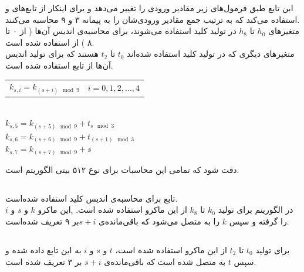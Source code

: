 این تابع طبق فرمول‌های زیر مقادیر ورودی را تغییر می‌دهد و برای اینکار از تابع‌های \hyperref[subsec:SKBI]{} و \hyperref[subsec:SKBT]{} استفاده می‌کند که به ترتیب جمع مقادیر ورودی‌شان را به پیمانه ۳ و ۹ محاسبه می‌کنند.
\\متغیرهای $ h_0 $ تا $ h_8 $ در تولید کلید استفاده می‌شوند، برای محاسبه‌ی اندیس آن‌ها ( از ۰ تا ۸ ) از  استفاده شده است.
\\
متغیر‌های دیگری که در تولید کلید استفاده شده‌اند $ t_0 $ تا $ t_2 $ هستند که برای تولید اندیس آن‌ها از تابع  استفاده شده است.\\
\begin{latin}
	\begin{center}
		\begin{tabular}{c c}
			$k_{s, i} = k_{(s+i) \mod 9} $ \hspace{15mm} & $  i = 0, 1, 2, ... , 4 $ \\
			
			
		\end{tabular}
	\\
	$k_{s, 5} = k_{(s+5) \mod 9} + t_{s \mod 3}$ \\
	$k_{s, 6} = k_{(s+6) \mod 9} + t_{(s+1) \mod 3}$ \\
	$k_{s, 7} = k_{(s+7) \mod 9} + s $\\	
	\end{center}
\end{latin}

دقت شود که تمامی این محاسبات برای نوع ۵۱۲ بیتی الگوریتم است.




\subsection{}
\label{subsec:SKBI}

تابع  برای محاسبه‌ی اندیس کلید استفاده‌ شده‌است. \\ 
در الگوریتم برای تولید $k_0 $ تا $ k_8 $ از این ماکرو استفاده شده ‌است.  ,این ماکرو $ k $ و $ s $ و $ i $ را گرفته و سپس $ k $ را به متصل می‌شود که باقی‌مانده‌ی ‌$s + i $بر ۹ تعریف شده‌است.


\subsection{}
\label{subsec:SKBT}
برای تولید $ t_0 $ تا $ t_2 $ از این ماکرو استفاده شده است، $ t $ و $ s $ و ‌$ i $ به این تابع داده شده و سپس $ t $ به  متصل شده است که باقی‌مانده‌ی $ s + i $ بر ۳ تعریف شده است.

